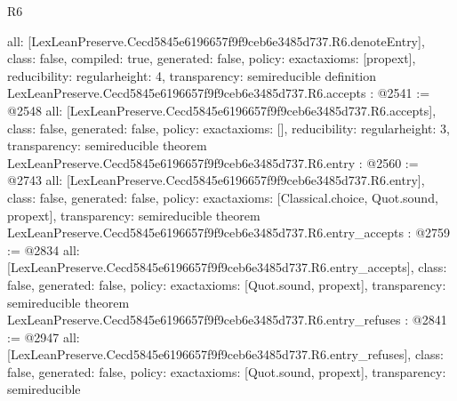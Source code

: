 \begin{lexlean}{R6}
\begin{coremodule}
{  all: [LexLeanPreserve.Cecd5845e6196657f9f9ceb6e3485d737.R6.denoteEntry],
  class: false,
  compiled: true,
  generated: false,
  policy: exact{axioms: [propext]},
  reducibility: regular{height: 4},
  transparency: semireducible
}
definition LexLeanPreserve.Cecd5845e6196657f9f9ceb6e3485d737.R6.accepts : @2541 := @2548 {
  all: [LexLeanPreserve.Cecd5845e6196657f9f9ceb6e3485d737.R6.accepts],
  class: false,
  generated: false,
  policy: exact{axioms: []},
  reducibility: regular{height: 3},
  transparency: semireducible
}
theorem LexLeanPreserve.Cecd5845e6196657f9f9ceb6e3485d737.R6.entry : @2560 := @2743 {
  all: [LexLeanPreserve.Cecd5845e6196657f9f9ceb6e3485d737.R6.entry],
  class: false,
  generated: false,
  policy: exact{axioms: [Classical.choice, Quot.sound, propext]},
  transparency: semireducible
}
theorem LexLeanPreserve.Cecd5845e6196657f9f9ceb6e3485d737.R6.entry_accepts : @2759 := @2834 {
  all: [LexLeanPreserve.Cecd5845e6196657f9f9ceb6e3485d737.R6.entry_accepts],
  class: false,
  generated: false,
  policy: exact{axioms: [Quot.sound, propext]},
  transparency: semireducible
}
theorem LexLeanPreserve.Cecd5845e6196657f9f9ceb6e3485d737.R6.entry_refuses : @2841 := @2947 {
  all: [LexLeanPreserve.Cecd5845e6196657f9f9ceb6e3485d737.R6.entry_refuses],
  class: false,
  generated: false,
  policy: exact{axioms: [Quot.sound, propext]},
  transparency: semireducible
}


\end{coremodule}
\end{lexlean}
